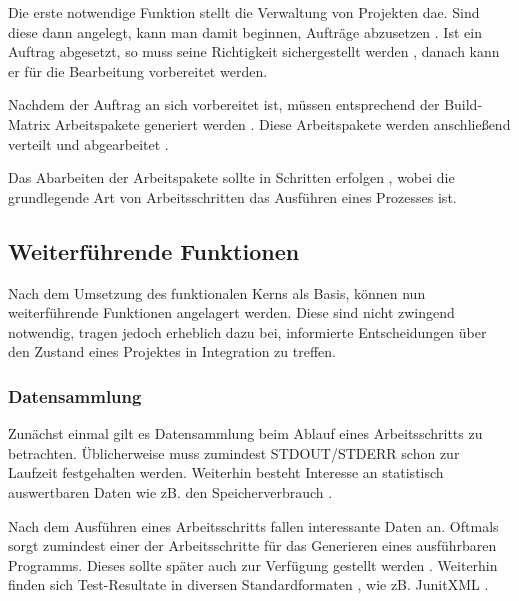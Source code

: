 Die erste notwendige Funktion stellt die Verwaltung von Projekten  dae.
Sind diese dann angelegt, kann man damit beginnen, Aufträge abzusetzen .
Ist ein Auftrag abgesetzt, so muss seine Richtigkeit sichergestellt werden ,
danach kann er für die Bearbeitung  vorbereitet werden.

Nachdem der Auftrag an sich vorbereitet ist, müssen entsprechend der Build-Matrix 
Arbeitspakete generiert werden .
Diese Arbeitspakete werden anschließend verteilt  und abgearbeitet .

Das Abarbeiten der Arbeitspakete sollte in Schritten erfolgen ,
wobei die grundlegende Art von Arbeitsschritten das Ausführen eines Prozesses  ist.


\subsection{Weiterführende Funktionen}

Nach dem Umsetzung des funktionalen Kerns als Basis,
k\"onnen nun weiterf\"uhrende Funktionen angelagert werden.
Diese sind nicht zwingend notwendig, tragen jedoch erheblich dazu bei,
informierte Entscheidungen \"uber den Zustand eines Projektes in Integration zu treffen.

\subsubsection{Datensammlung}

Zun\"achst einmal gilt es Datensammlung beim Ablauf eines Arbeitsschritts zu betrachten.
\"Ublicherweise muss zumindest STDOUT/STDERR schon zur Laufzeit festgehalten  werden.
Weiterhin besteht  Interesse an statistisch auswertbaren Daten
wie zB. den Speicherverbrauch .

Nach dem Ausf\"uhren eines Arbeitsschritts fallen interessante Daten an.
Oftmals sorgt zumindest einer der Arbeitsschritte für das Generieren eines ausführbaren Programms.
Dieses sollte sp\"ater auch zur Verf\"ugung gestellt werden .
Weiterhin finden sich Test-Resultate in diversen Standardformaten ,
wie zB. JunitXML \cite{jenkins:junitxml}.

